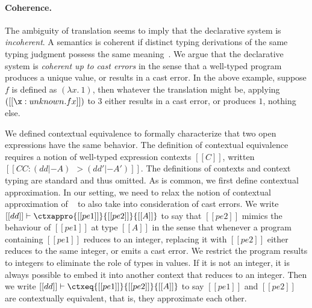 \paragraph{Coherence.}

The ambiguity of translation seems to imply that the declarative system is
\emph{incoherent}. A semantics is coherent if distinct typing derivations of
the same typing judgment possess the same meaning~\citep{Reynolds_coherence}. We
argue that the declarative system is \emph{coherent up to cast errors} in the
sense that a well-typed program produces a unique value, or results in a cast
error. In the above example, suppose $f$ is defined as $(\lambda x .~1)$, then
whatever the translation might be, applying $([[ \x : unknown . f x ]])$ to $3$
either results in a cast error, or produces $1$, nothing else.

We defined contextual equivalence \citep{morris1969lambda} to formally
characterize that two open expressions have the same behavior. The definition of
contextual equivalence requires a notion of well-typed expression contexts
$[[C]]$, written $ [[ CC : (dd |- A) ~~> (dd' |- A') ]] $. The definitions of
contexts and context typing are standard and thus omitted. As is common, we
first define contextual approximation. In our setting, we need to
relax the notion of 
contextual approximation of \pbc~\citep{amal2017blame} to also take into
consideration of cast errors. We write $[[dd]] \vdash
\ctxappro{[[pe1]]}{[[pe2]]}{[[A]]}$ to say that $[[pe2]]$ mimics the behaviour
of $[[pe1]]$ at type $[[A]]$ in the sense that whenever a program containing
$[[pe1]]$ reduces to an integer, replacing it with $[[pe2]]$ either reduces to
the same integer, or emits a cast error.
We restrict the program results
to integers to eliminate the role of types in values. If it is not an integer,
it is always possible to embed it into another context that reduces to an
integer. Then we write $[[dd]] \vdash \ctxeq{[[pe1]]}{[[pe2]]}{[[A]]}$ to say
$[[pe1]]$ and $[[pe2]]$ are contextually equivalent, that is, they approximate
each other.

